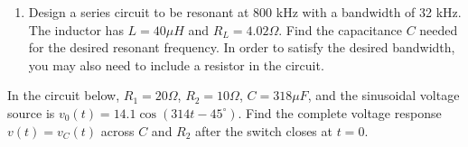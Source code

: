 \begin{enumerate}

\item Design a series circuit to be resonant at 800 kHz with a bandwidth
  of 32 kHz. The inductor has $L=40 \mu H$ and $R_L=4.02 \Omega$. Find the
  capacitance $C$ needed for the desired resonant frequency. In order to 
  satisfy the desired bandwidth, you may also need to include a resistor in 
  the circuit. 


\end{enumerate}





\item In the circuit below, $R_1=20\Omega$, $R_2=10\Omega$, $C=318\mu F$,
and the sinusoidal voltage source is $v_0(t)=14.1 \cos(314 t-45^{\circ})$.
Find the complete voltage response $v(t)=v_C(t)$ across $C$ and $R_2$ after
the switch closes at $t=0$.




